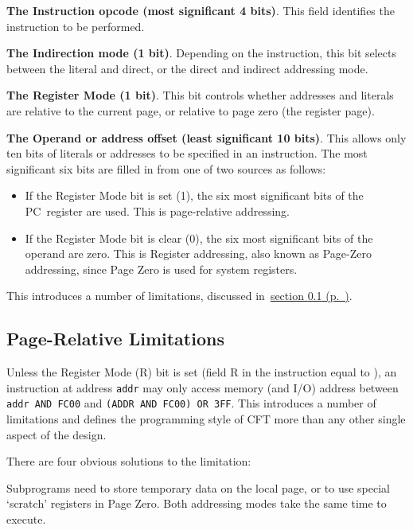 \documentclass[11pt,a4paper,twocolumns]{article}
\newcommand{\cf}[2][section]{\hyperref[#2]{#1 \ref*{#2} (p.~\pageref*{#2})}}
\newcommand\register[1]{\textsf{#1}}
\newcommand\PC{\register{PC}}
\begin{document}
\begin{description}
\item{\bf The Instruction opcode (most significant 4 bits)}. This
  field identifies the instruction to be performed.
\item{\bf The Indirection mode (1 bit)}. Depending on the instruction,
  this bit selects between the literal and direct, or the direct and
  indirect addressing mode.
\item{\bf The Register Mode (1 bit)}. This bit controls whether
  addresses and literals are relative to the current page, or relative
  to page zero (the register page).
\item{\bf The Operand or address offset (least significant 10
  bits)}. This allows only ten bits of literals or addresses to be
  specified in an instruction. The most significant six bits are
  filled in from one of two sources as follows:
  \begin{itemize}
  \item If the Register Mode bit is set (1), the six most significant bits
    of the \PC\ register are used. This is page-relative addressing.
  \item If the Register Mode bit is clear (0), the six most
    significant bits of the operand are zero. This is Register
    addressing, also known as Page-Zero addressing, since Page Zero is
    used for system registers.
  \end{itemize}
  This introduces a number of limitations, discussed in~\cf{sec-pagerel}.
\end{description}

\subsection{Page-Relative Limitations}
\label{sec-pagerel}

Unless the Register Mode (R) bit is set (field R in the instruction
equal to {}), an instruction at address {\tt addr} may only access
memory (and I/O) address between {\tt addr AND FC00} and {\tt (ADDR
  AND FC00) OR 3FF}. This introduces a number of limitations and
defines the programming style of CFT more than any other single aspect
of the design.

There are four obvious solutions to the limitation:

Subprograms need to store temporary data on the local page, or to use
special ‘scratch’ registers in Page Zero. Both addressing modes take
the same time to execute.
\end{document}
